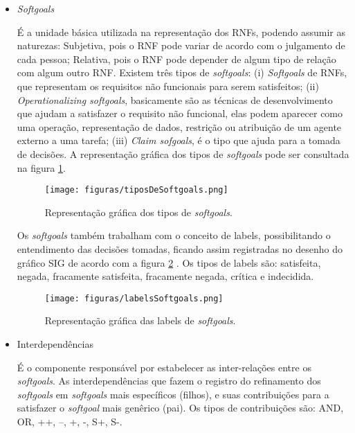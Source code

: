 \begin{itemize}
	\item \textit{Softgoals}
	
	É a unidade básica utilizada na representação dos RNFs, podendo assumir as naturezas: Subjetiva, pois o RNF pode variar de acordo com o julgamento de cada pessoa; Relativa, pois o RNF pode depender de algum tipo de relação com algum outro RNF. Existem três tipos de \textit{softgoals}: (i) \textit{Softgoals} de RNFs, que representam os requisitos não funcionais para serem satisfeitos; (ii) \textit{Operationalizing softgoals}, basicamente são as técnicas de desenvolvimento que ajudam a satisfazer o requisito não funcional, elas podem aparecer como uma operação, representação de dados, restrição ou atribuição de um agente externo a uma tarefa; (iii) \textit{Claim sofgoals}, é o tipo que ajuda para a tomada de decisões. A representação gráfica dos tipos de \textit{softgoals} pode ser consultada na figura \ref{fig01}.
	
	\begin{figure}[h]
		\centering
		\texttt{[image: figuras/tiposDeSoftgoals.png]}
		\caption{Representação gráfica dos tipos de \textit{softgoals}.}
		\label{fig01}
	\end{figure} 

	Os \textit{softgoals} também trabalham com o conceito de labels, possibilitando o entendimento das decisões tomadas, ficando assim registradas no desenho do gráfico SIG de acordo com  a figura \ref{fig02} . Os tipos de labels são: satisfeita, negada, fracamente satisfeita, fracamente negada, crítica e indecidida.
	

	\begin{figure}[h]
		\centering
		\texttt{[image: figuras/labelsSoftgoals.png]}
		\caption{Representação gráfica das labels de \textit{softgoals}.}
		\label{fig02}
	\end{figure} 

	\item Interdependências
	
	É o componente responsável por estabelecer as inter-relações entre os \textit{softgoals}. As interdependências que fazem o registro do refinamento dos \textit{softgoals} em \textit{softgoals} mais específicos (filhos), e suas contribuições para a satisfazer o \textit{softgoal} mais genêrico (pai). Os tipos de contribuições são: AND, OR, ++, --, +, -, S+, S-. 
	

\end{itemize}

